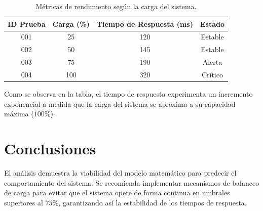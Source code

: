 \documentclass[11pt, a4paper]{article}
\begin{document}
\begin{table}[h!]
\centering
\caption{Métricas de rendimiento según la carga del sistema.}
\label{tab:resultados}
\begin{tabular}{cccc}
\toprule
\textbf{ID Prueba} & \textbf{Carga (\%)} & \textbf{Tiempo de Respuesta (ms)} & \textbf{Estado} \\
\midrule
001 & 25  & 120 & Estable \\
002 & 50  & 145 & Estable \\
003 & 75  & 190 & Alerta \\
004 & 100 & 320 & Crítico \\
\bottomrule
\end{tabular}
\end{table}

Como se observa en la tabla, el tiempo de respuesta experimenta un incremento exponencial a medida que la carga del sistema se aproxima a su capacidad máxima ($100\%$).

\newpage

\section{Conclusiones}
El análisis demuestra la viabilidad del modelo matemático para predecir el comportamiento del sistema. Se recomienda implementar mecanismos de balanceo de carga para evitar que el sistema opere de forma continua en umbrales superiores al $75\%$, garantizando así la estabilidad de los tiempos de respuesta.
\end{document}
